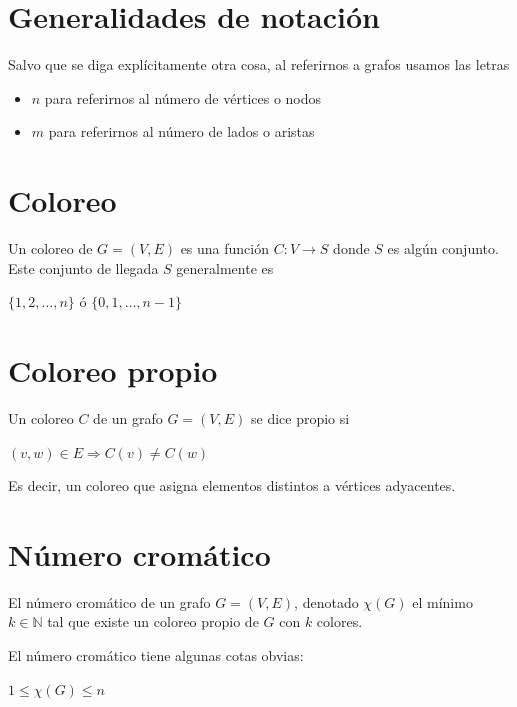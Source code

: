 \documentclass[10pt,a4paper]{article}
\begin{document}
\section*{Generalidades de notación}

Salvo que se diga explícitamente otra cosa, al referirnos a grafos usamos las letras

\begin{itemize}

	\item $n$ para referirnos al número de vértices o nodos
	\item $m$ para referirnos al número de lados o aristas
\end{itemize}

\section*{Coloreo}

Un coloreo de $G = (V, E)$ es una función $C: V \rightarrow S$ donde $S$ es algún conjunto. Este conjunto de llegada $S$ generalmente es

\begin{center}
$\{1, 2,\dots, n\}$ ó $\{0, 1, \dots, n-1\}$
\end{center}

\section*{Coloreo propio}

Un coloreo $C$ de un grafo $G=(V, E)$ se dice propio si

\begin{center}
$(v, w) \in E \Rightarrow C(v) \neq C(w)$
\end{center}

Es decir, un coloreo que asigna elementos distintos a vértices adyacentes.

\section*{Número cromático}

El número cromático de un grafo $G = (V, E)$, denotado $\chi(G)$ el mínimo $k \in \mathbb{N}$ tal que existe un coloreo propio de $G$ con $k$ colores.

El número cromático tiene algunas cotas obvias:

\begin{center}
$1 \leq \chi(G)\leq n$
\end{center}
\end{document}

